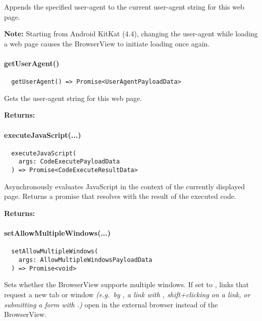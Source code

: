 Appends the specified user-agent to the current user-agent string for this web page.

\textbf{Note:} Starting from Android KitKat (4.4), changing the user-agent while
loading a web page causes the BrowserView to initiate loading once again.~\cite{android:api}



\paragraph{getUserAgent()}

\begin{verbatim}
  getUserAgent() => Promise<UserAgentPayloadData>
\end{verbatim}

Gets the user-agent string for this web page.

\textbf{Returns:} 


\newpage

\paragraph{executeJavaScript(...)}

\begin{verbatim}
  executeJavaScript(
    args: CodeExecutePayloadData
  ) => Promise<CodeExecuteResultData>
\end{verbatim}

Asynchronously evaluates JavaScript in the context of the currently displayed page.
Returns a promise that resolves with the result of the executed code.

\textbf{Returns:} 



\paragraph{setAllowMultipleWindows(...)}

\begin{verbatim}
  setAllowMultipleWindows(
    args: AllowMultipleWindowsPayloadData
  ) => Promise<void>
\end{verbatim}

Sets whether the BrowserView supports multiple windows.
If set to , links that request a new tab or window \textit{(e.g.\ by , a link with ,
shift+clicking on a link, or submitting a form with .)} open in the external browser
instead of the BrowserView.

